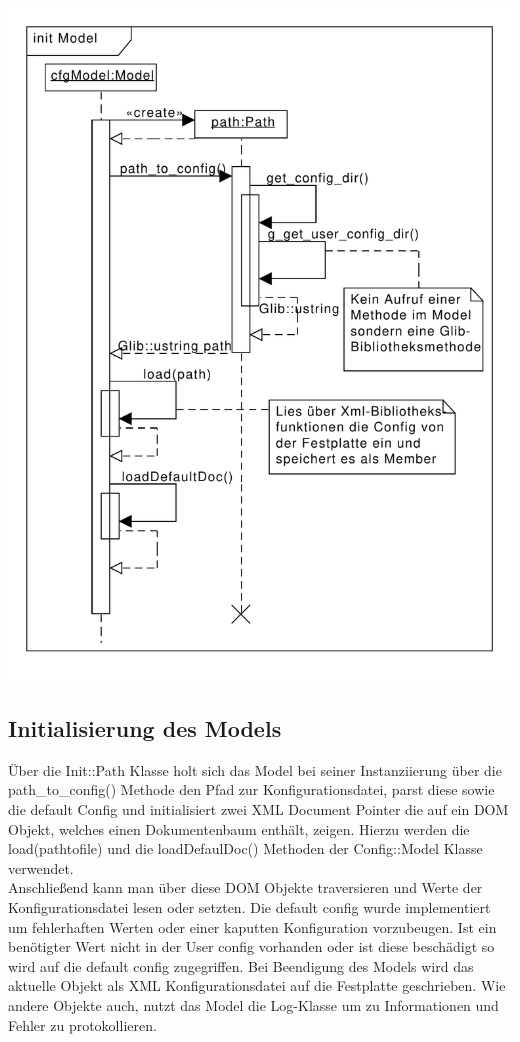 

\includegraphics[scale=0.6]{init.pdf}
\label{c_modelinit}

\subsection{Initialisierung des Models}

 
Über die Init::Path Klasse holt sich das Model bei seiner Instanziierung über die path\_to\_config() Methode
den Pfad zur Konfigurationsdatei, parst diese sowie die default Config und 
initialisiert zwei XML Document Pointer die auf ein DOM Objekt, welches einen Dokumentenbaum enthält, zeigen.
Hierzu werden die load(pathtofile) und die loadDefaulDoc() Methoden der Config::Model Klasse verwendet.
\\   

Anschließend kann man über diese DOM Objekte traversieren und Werte der Konfigurationsdatei lesen oder setzten.
Die default config wurde implementiert um fehlerhaften Werten oder einer kaputten Konfiguration vorzubeugen. Ist ein benötigter Wert
nicht in der User config vorhanden oder ist diese beschädigt so wird auf die default config zugegriffen.
Bei Beendigung des Models wird das aktuelle Objekt als XML Konfigurationsdatei auf die Festplatte geschrieben.
Wie andere Objekte auch, nutzt das Model die Log-Klasse um zu Informationen und Fehler zu protokollieren.


